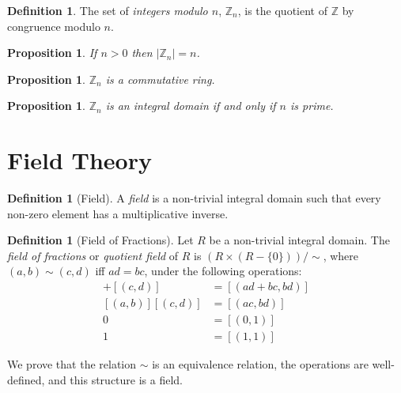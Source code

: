 \documentclass{article}
\newtheorem{proposition}[axiom]{Proposition}
\theoremstyle{definition}
\newtheorem{definition}[axiom]{Definition}
\begin{document}
    \begin{definition}
        The set of \emph{integers modulo $n$}, $\mathbb{Z}_n$, is the quotient of $\mathbb{Z}$ by 
        congruence modulo $n$.
    \end{definition}

    \begin{proposition}
        If $n > 0$ then $|\mathbb{Z}_n| = n$.
    \end{proposition}

    \begin{proposition}
        $\mathbb{Z}_n$ is a commutative ring.
    \end{proposition}

    \begin{proposition}
        $\mathbb{Z}_n$ is an integral domain if and only if $n$ is prime.
    \end{proposition}
    \section{Field Theory}

    \begin{definition}[Field]
        A \emph{field} is a non-trivial integral domain such that every non-zero element has a multiplicative
        inverse.
    \end{definition}

    \begin{definition}[Field of Fractions]
        Let $R$ be a non-trivial integral domain. The \emph{field of fractions} or \emph{quotient field} of $R$ is $(R \times (R - \{ 0 \})) / \sim$,
        where $(a,b) \sim (c,d)$ iff $ad = bc$, under the following operations:
        \begin{align*}
            [(a,b)] + [(c,d)] & = [(ad+bc,bd)] \\
            [(a,b)][(c,d)] & = [(ac,bd)] \\
            0 & = [(0,1)] \\
            1 & = [(1,1)]
        \end{align*}

        We prove that the relation $\sim$ is an equivalence relation, the operations are well-defined, and this
        structure is a field.
    \end{definition}
\end{document}
